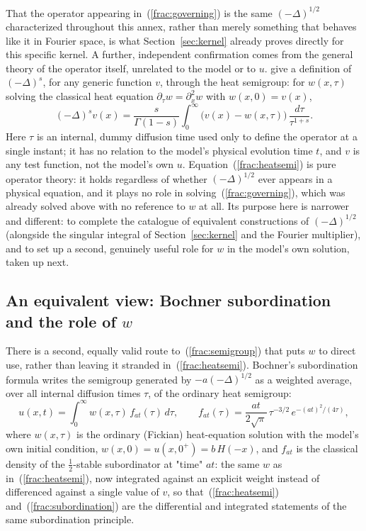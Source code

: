 \documentclass{article}
\begin{document}
That the operator appearing in~(\ref{frac:governing}) is the same
$(-\Delta)^{1/2}$ characterized throughout this annex, rather than merely
something that behaves like it in Fourier space, is what
Section~\ref{sec:kernel} already proves directly for this specific kernel.
A further, independent confirmation comes from the general theory of the
operator itself, unrelated to the model or to $u$.
\citet{daoud2022fractional} give a definition of $(-\Delta)^s$, for any
generic function $v$, through the heat semigroup: for $w(x,\tau)$ solving
the classical heat equation $\partial_\tau w = \partial_x^2 w$ with
$w(x,0)=v(x)$,
\begin{equation}
(-\Delta)^s v(x) = \frac{s}{\Gamma(1-s)}\int_0^\infty
  \big(v(x)-w(x,\tau)\big)\,\frac{d\tau}{\tau^{1+s}}.
\label{frac:heatsemi}
\end{equation}
Here $\tau$ is an internal, dummy diffusion time used only to define the
operator at a single instant; it has no relation to the model's physical
evolution time $t$, and $v$ is any test function, not the model's own $u$.
Equation~(\ref{frac:heatsemi}) is pure operator theory: it holds regardless
of whether $(-\Delta)^{1/2}$ ever appears in a physical equation, and it
plays no role in solving~(\ref{frac:governing}), which was already solved
above with no reference to $w$ at all. Its purpose here is narrower and
different: to complete the catalogue of equivalent constructions of
$(-\Delta)^{1/2}$ (alongside the singular integral of
Section~\ref{sec:kernel} and the Fourier multiplier), and to set up a
second, genuinely useful role for $w$ in the model's own solution, taken up
next.

\subsection{An equivalent view: Bochner subordination and the role of $w$}
\label{sec:semigroup-subordination}

There is a second, equally valid route
to~(\ref{frac:semigroup}) that puts $w$ to direct use, rather than leaving
it stranded in~(\ref{frac:heatsemi}). Bochner's subordination formula
writes the semigroup generated by $-a(-\Delta)^{1/2}$ as a weighted average,
over all internal diffusion times $\tau$, of the ordinary heat semigroup:
\begin{equation}
u(x,t) = \int_0^\infty w(x,\tau)\,f_{at}(\tau)\,d\tau,
\qquad
f_{at}(\tau) = \frac{at}{2\sqrt\pi}\,\tau^{-3/2}\,e^{-(at)^2/(4\tau)},
\label{frac:subordination}
\end{equation}
where $w(x,\tau)$ is the ordinary (Fickian) heat-equation solution with the
model's own initial condition, $w(x,0)=u(x,0^+)=b\,H(-x)$, and $f_{at}$ is
the classical density of the $\tfrac12$-stable subordinator at
"time" $at$: the same $w$ as in~(\ref{frac:heatsemi}), now integrated
against an explicit weight instead of differenced against a single value
of $v$, so that~(\ref{frac:heatsemi}) and~(\ref{frac:subordination}) are
the differential and integrated statements of the same subordination
principle.
\end{document}
